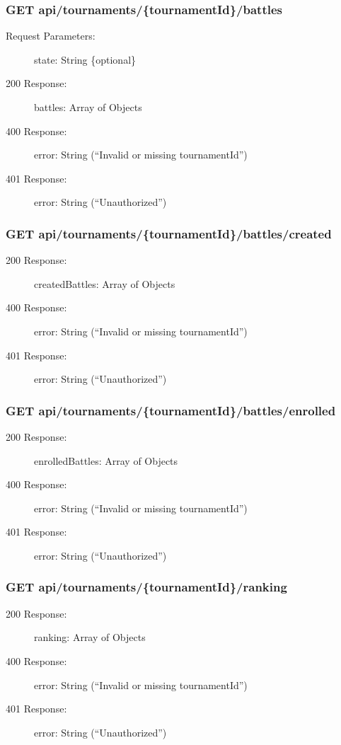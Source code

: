 \documentclass{Configuration_Files/Template}
\begin{document}
\subsubsection{GET api/tournaments/\{tournamentId\}/battles}
\begin{description}
    \item[Request Parameters:] state: String \{optional\}
    \item[200 Response:] battles: Array of Objects
    \item[400 Response:] error: String (“Invalid or missing tournamentId”)
    \item[401 Response:] error: String (“Unauthorized”)
\end{description}

\subsubsection{GET api/tournaments/\{tournamentId\}/battles/created}
\begin{description}
    \item[200 Response:] createdBattles: Array of Objects
    \item[400 Response:] error: String (“Invalid or missing tournamentId”)
    \item[401 Response:] error: String (“Unauthorized”)
\end{description}

\subsubsection{GET api/tournaments/\{tournamentId\}/battles/enrolled}
\begin{description}
    \item[200 Response:] enrolledBattles: Array of Objects
    \item[400 Response:] error: String (“Invalid or missing tournamentId”)
    \item[401 Response:] error: String (“Unauthorized”)
\end{description}


\subsubsection{GET api/tournaments/\{tournamentId\}/ranking}
\begin{description}
    \item[200 Response:] ranking: Array of Objects
    \item[400 Response:] error: String (“Invalid or missing tournamentId”)
    \item[401 Response:] error: String (“Unauthorized”)
\end{description}
\end{document}
